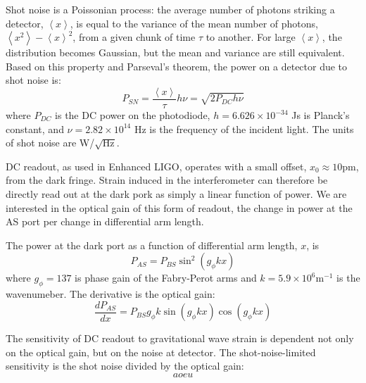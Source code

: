 Shot noise is a Poissonian process: the average number of photons
striking a detector, $\left<x\right>$, is equal to the variance of the
mean number of photons, $\left<x^2\right> - \left<x\right>^2$, from a
given chunk of time $\tau$ to another. For large $\left<x\right>$, the
distribution becomes Gaussian, but the mean and variance are still
equivalent. Based on this property and Parseval's theorem, the power
on a detector due to shot noise is:
\begin{equation}
P_{SN} = \frac{\left<x\right>}{\tau} h \nu = \sqrt{2 P_{DC} h \nu}
\end{equation}
where $P_{DC}$ is the DC power on the photodiode, $h = 6.626 \times
10^{-34}$ Js is Planck's constant, and $\nu = 2.82 \times 10^{14}$ Hz
is the frequency of the incident light. The units of shot noise are
W/$\sqrt{\mathrm{Hz}}$.

DC readout, as used in Enhanced LIGO, operates with a small offset,
$x_0 \approx 10 \mathrm{pm}$, from the dark fringe. Strain induced in the
interferometer can therefore be directly read out at the dark pork as
simply a linear function of power. We are interested in the optical
gain of this form of readout, the change in power at the AS port per
change in differential arm length. 

The power at the dark port as a function of differential arm length,
$x$, is
\begin{equation}
P_{AS} = P_{BS} \sin^2{(g_{\phi}kx)}
\end{equation}
where $g_{\phi} = 137$ is phase gain of the Fabry-Perot arms and
$k=5.9\times10^6 \mathrm{m}^{-1}$ is the wavenumeber. The derivative
is the optical gain:
\begin{equation}
\frac{dP_{AS}}{dx} = P_{BS} g_{\phi} k \sin{(g_{\phi}kx)} \cos{(g_{\phi}kx)}
\end{equation}

The sensitivity of DC readout to gravitational wave strain is
dependent not only on the optical gain, but on the noise at
detector. The shot-noise-limited sensitivity is the shot noise divided
by the optical gain:
\begin{equation}
aoeu
\end{equation}

